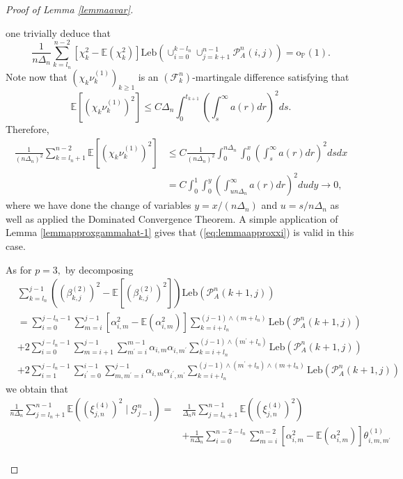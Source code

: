 \documentclass[10pt,a4paper]{amsart}
\newcommand{\Leb}{\ensuremath{\mathrm{Leb}}}
\begin{document}
\begin{proof}[Proof of Lemma \ref{lemmaavar}]
\begin{description}
		one trivially deduce that 
		\[
		\frac{1}{n\Delta_{n}}\sum_{k=l_{n}}^{n-2}[\chi_{k}^{2}-\mathbb{E}(\chi_{k}^{2})]\Leb(\cup_{i=0}^{k-l_{n}}\cup_{j=k+1}^{n-1}\mathcal{P}_{A}^{n}(i,j))=\mathrm{o}_{\mathbb{P}}(1).
		\]
		Note now that $(\chi_{k}\nu_{k}^{(1)})_{k\geq1}$ is an $(\mathscr{F}_{k}^{n})$-martingale
		difference satisfying that 
		\[
		\mathbb{E}[(\chi_{k}\nu_{k}^{(1)})^{2}]\leq C\Delta_{n}\int_{0}^{t_{k+1}}(\int_{s}^{\infty}a(r)dr)^{2}ds.
		\]
		Therefore, 
		\begin{align*}
			\frac{1}{(n\Delta_{n})^{2}}\sum_{k=l_{n}+1}^{n-2}\mathbb{E}\left[(\chi_{k}\nu_{k}^{(1)})^{2}\right] & \leq C\frac{1}{(n\Delta_{n})^{2}}\int_{0}^{n\Delta_{n}}\int_{0}^{x}(\int_{s}^{\infty}a(r)dr)^{2}dsdx\\
			& =C\int_{0}^{1}\int_{0}^{y}(\int_{un\Delta_{n}}^{\infty}a(r)dr)^{2}dudy\rightarrow0,
		\end{align*}
		where we have done the change of variables $y=x/(n\Delta_{n})$ and
		$u=s/n\Delta_{n}$ as well as applied the Dominated Convergence Theorem.
		A simple application of Lemma \ref{lemmapproxgammahat-1} gives that
		(\ref{eq:lemmaapproxxi}) is valid in this case.
		\item [{$p=4$:}] As for $p=3,$ by decomposing 
		\begin{align*}
			&\sum_{k=l_{n}}^{j-1}\left((\beta_{k,j}^{(2)})^{2}-\mathbb{E}[(\beta_{k,j}^{(2)})^{2}]\right)\Leb(\mathcal{P}_{A}^{n}(k+1,j)) \\
			& =\sum_{i=0}^{j-l_{n}-1}\sum_{m=i}^{j-1}[\alpha_{i,m}^{2}-\mathbb{E}(\alpha_{i,m}^{2})]\sum_{k=i+l_{n}}^{(j-1)\land(m+l_{n})}\Leb(\mathcal{P}_{A}^{n}(k+1,j))\\
			& +2\sum_{i=0}^{j-l_{n}-1}\sum_{m=i+1}^{j-1}\sum_{m^{\prime}=i}^{m-1}\alpha_{i,m}\alpha_{i,m^{\prime}}\sum_{k=i+l_{n}}^{(j-1)\land(m^{\prime}+l_{n})}\Leb(\mathcal{P}_{A}^{n}(k+1,j))\\
			& +2\sum_{i=1}^{j-l_{n}-1}\sum_{i^{\prime}=0}^{i-1}\sum_{m,m^{\prime}=i}^{j-1}\alpha_{i,m}\alpha_{i^{\prime},m^{\prime}}\sum_{k=i+l_{n}}^{(j-1)\land(m^{\prime}+l_{n})\land(m+l_{n})}\Leb(\mathcal{P}_{A}^{n}(k+1,j))
		\end{align*}
		we obtain that
		\begin{equation}
			\begin{aligned}\frac{1}{n\Delta_{n}}\sum_{j=l_{n}+1}^{n-1}\mathbb{E}((\xi_{j,n}^{(4)})^{2}\mid\mathscr{G}_{j-1}^{n})= & \frac{1}{\Delta_{n}n}\sum_{j=l_{n}+1}^{n-1}\mathbb{E}((\xi_{j,n}^{(4)})^{2})\\
				& +\frac{1}{n\Delta_{n}}\sum_{i=0}^{n-2-l_{n}}\sum_{m=i}^{n-2}[\alpha_{i,m}^{2}-\mathbb{E}(\alpha_{i,m}^{2})]\theta_{i,m,m^{\prime}}^{(1)}\\

\end{aligned}
\end{equation}
\end{description}
\end{proof}
\end{document}
